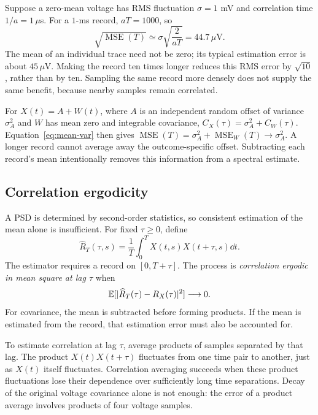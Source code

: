 \begin{example}[title={How long must a record be to estimate the mean?}]
Suppose a zero-mean voltage has RMS fluctuation $\sigma=1$ mV and correlation time $1/a=1\,\mu$s. For a $1$-ms record, $aT=1000$, so
\[
\sqrt{\operatorname{MSE}(T)}
\simeq\sigma\sqrt{\frac{2}{aT}}
=44.7\,\mu\mathrm V.
\]
The mean of an individual trace need not be zero; its typical estimation error is about $45\,\mu$V. Making the record ten times longer reduces this RMS error by $\sqrt{10}$, rather than by ten. Sampling the same record more densely does not supply the same benefit, because nearby samples remain correlated.
\end{example}

For $X(t)=A+W(t)$, where $A$ is an independent random offset of variance $\sigma_A^2$ and $W$ has mean zero and integrable covariance,
$C_X(\tau)=\sigma_A^2+C_W(\tau)$. Equation~\eqref{eq:mean-var} then gives
$\operatorname{MSE}(T)=\sigma_A^2+\operatorname{MSE}_W(T)\to\sigma_A^2$.
A longer record cannot average away the outcome-specific offset. Subtracting each record's mean intentionally removes this information from a spectral estimate.

\subsection{Correlation ergodicity}
\label{sec:corr-ergodicity}
A PSD is determined by second-order statistics, so consistent estimation of the mean alone is insufficient. For fixed $\tau\geq0$, define
\[
\widehat R_T(\tau,s)=\frac1T\int_0^T X(t,s)X(t+\tau,s)\dd t.
\]
The estimator requires a record on $[0,T+\tau]$. The process is \emph{correlation ergodic in mean square at lag $\tau$} when
\begin{equation}
\mathbb E[|\widehat R_T(\tau)-R_X(\tau)|^2]\longrightarrow0.
\end{equation}
For covariance, the mean is subtracted before forming products. If the mean is estimated from the record, that estimation error must also be accounted for.

To estimate correlation at lag $\tau$, average products of samples separated by that lag. The product $X(t)X(t+\tau)$ fluctuates from one time pair to another, just as $X(t)$ itself fluctuates. Correlation averaging succeeds when these product fluctuations lose their dependence over sufficiently long time separations. Decay of the original voltage covariance alone is not enough: the error of a product average involves products of four voltage samples.

